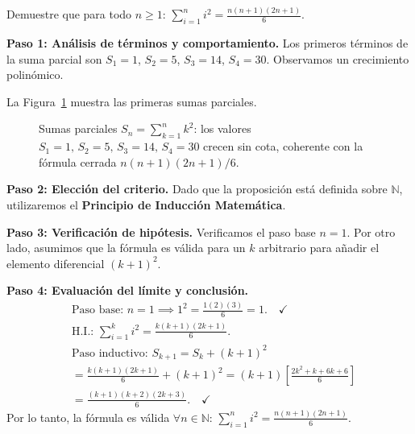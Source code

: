 \begin{example}
Demuestre que para todo $n \geq 1$: $\displaystyle \sum_{i=1}^n i^2 = \frac{n(n+1)(2n+1)}{6}$.
\begin{myproof}
\textbf{Paso 1: Análisis de términos y comportamiento.}
Los primeros términos de la suma parcial son $S_1 = 1$, $S_2 = 5$, $S_3 = 14$, $S_4 = 30$. Observamos un crecimiento polinómico. 

La Figura~\ref{fig:suma_parcial_cuadrados} muestra las primeras sumas parciales.

\begin{figure}[H]
\centering
{}
\caption{Sumas parciales $S_n=\sum_{k=1}^n k^2$: los valores $S_1=1,\,S_2=5,\,S_3=14,\,S_4=30$ crecen sin cota, coherente con la fórmula cerrada $n(n+1)(2n+1)/6$.}
\label{fig:suma_parcial_cuadrados}
\end{figure}

\textbf{Paso 2: Elección del criterio.}
Dado que la proposición está definida sobre $\mathbb{N}$, utilizaremos el \textbf{Principio de Inducción Matemática}.

\textbf{Paso 3: Verificación de hipótesis.}
Verificamos el paso base $n=1$. Por otro lado, asumimos que la fórmula es válida para un $k$ arbitrario para añadir el elemento diferencial $(k+1)^2$.

\textbf{Paso 4: Evaluación del límite y conclusión.}
\begin{align*}
    &\text{Paso base: } n=1 \implies 1^2 = \frac{1(2)(3)}{6} = 1. \quad \checkmark \\
    &\text{H.I.: } \sum_{i=1}^k i^2 = \frac{k(k+1)(2k+1)}{6}. \\
    &\text{Paso inductivo: } S_{k+1} = S_k + (k+1)^2 \\
    &= \frac{k(k+1)(2k+1)}{6} + (k+1)^2 = (k+1) \left[ \frac{2k^2+k+6k+6}{6} \right] \\
    &= \frac{(k+1)(k+2)(2k+3)}{6}. \quad \checkmark
\end{align*}
Por lo tanto, la fórmula es válida $\forall n \in \mathbb{N}$: $\boxed{\sum_{i=1}^n i^2 = \frac{n(n+1)(2n+1)}{6}}$.
\end{myproof}
\end{example}

